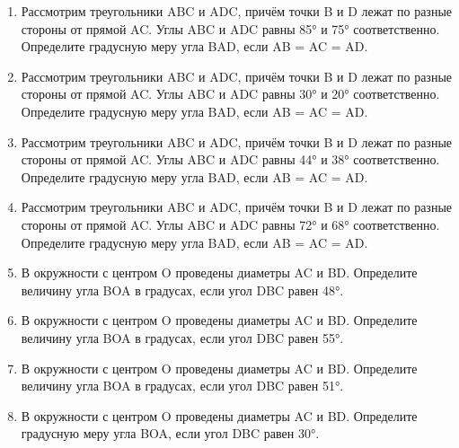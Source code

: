 \documentclass[a4paper,12pt]{article}
\newcommand{\taskspace}{\par\vspace{0.42cm}}
\begin{document}
\begin{enumerate}[resume]
\taskspace

\item Рассмотрим треугольники ABC и ADC, причём точки B и D лежат по разные стороны от прямой AC. Углы ABC и ADC равны 85° и 75° соответственно. Определите градусную меру угла BAD, если AB = AC = AD.

\taskspace

\item Рассмотрим треугольники ABC и ADC, причём точки B и D лежат по разные стороны от прямой AC. Углы ABC и ADC равны 30° и 20° соответственно. Определите градусную меру угла BAD, если AB = AC = AD.

\taskspace

\item Рассмотрим треугольники ABC и ADC, причём точки B и D лежат по разные стороны от прямой AC. Углы ABC и ADC равны 44° и 38° соответственно. Определите градусную меру угла BAD, если AB = AC = AD.

\taskspace

\item Рассмотрим треугольники ABC и ADC, причём точки B и D лежат по разные стороны от прямой AC. Углы ABC и ADC равны 72° и 68° соответственно. Определите градусную меру угла BAD, если AB = AC = AD.

\taskspace

\item В окружности с центром O проведены диаметры AC и BD. Определите величину угла BOA в градусах, если угол DBC равен 48°.

\taskspace

\item В окружности с центром O проведены диаметры AC и BD. Определите величину угла BOA в градусах, если угол DBC равен 55°.

\taskspace

\item В окружности с центром O проведены диаметры AC и BD. Определите величину угла BOA в градусах, если угол DBC равен 51°.

\taskspace

\item В окружности с центром O проведены диаметры AC и BD. Определите градусную меру угла BOA, если угол DBC равен 30°.

\taskspace


\end{enumerate}
\end{document}
